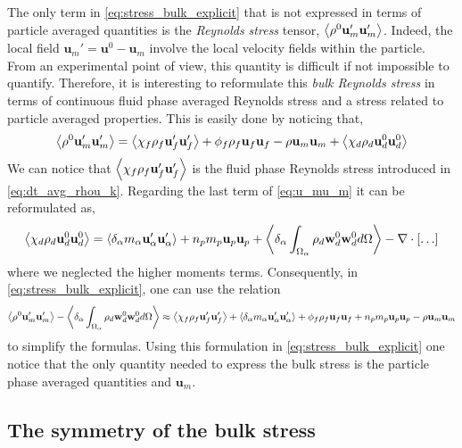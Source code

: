 The only term in \ref{eq:stress_bulk_explicit} that is not expressed in terms of particle averaged quantities is the \textit{Reynolds stress} tensor, $\left<\rho^0 \textbf{u}'_m\textbf{u}'_m\right>$. 
Indeed, the local field $\textbf{u}_m' = \textbf{u}^0 - \textbf{u}_m$ involve the local velocity fields within the particle.
From an experimental point of view, this quantity is difficult if not impossible to quantify.  
Therefore, it is interesting to reformulate this \textit{bulk Reynolds stress} in terms of continuous fluid phase averaged Reynolds stress and a stress related to particle averaged properties. 
This is easily done by noticing that, 
\begin{equation*}
    \avg{\rho^0 \textbf{u}'_m\textbf{u}'_m}
    = 
    \avg{\chi_f \rho_f \textbf{u}_f'\textbf{u}_f'}
    + \phi_f \rho_f \textbf{u}_f\textbf{u}_f
    - \rho \textbf{u}_m\textbf{u}_m
    + \avg{\chi_d \rho_d \textbf{u}_d^0\textbf{u}_d^0}
    \label{eq:u_mu_m}
\end{equation*}
We can notice that $\left<\chi_f \rho_f \textbf{u}_f'\textbf{u}_f'\right>$ is the fluid phase Reynolds stress introduced in \ref{eq:dt_avg_rhou_k}. 
Regarding the last term of \ref{eq:u_mu_m} it can be reformulated as, 
\begin{equation*}
    \left<\chi_d \rho_d \textbf{u}_d^0\textbf{u}_d^0\right>
    = 
    \left<\delta_\alpha  m_\alpha \textbf{u}_\alpha' \textbf{u}_\alpha' \right>
    + n_p m_p \textbf{u}_p\textbf{u}_p
    + \left<\delta_\alpha \int_{\Omega_{\alpha}} \rho_d \textbf{w}_d^0 \textbf{w}_d^0 d\Omega\right>
    - \mathbf{\nabla}\cdot [\ldots]
\end{equation*}
where we neglected the higher moments terms. 
Consequently, in \ref{eq:stress_bulk_explicit}, one can use the relation 
\begin{equation*}
    \left<\rho^0 \textbf{u}'_m\textbf{u}'_m\right>
    - \left<\delta_\alpha \int_{\Omega_{\alpha}} \rho_d \textbf{w}_d^0 \textbf{w}_d^0 d\Omega\right>
    \approx 
    \left<\chi_f \rho_f \textbf{u}_f'\textbf{u}_f'\right>
    + \left<\delta_\alpha  m_\alpha \textbf{u}_\alpha'\textbf{u}_\alpha'\right>
    + \phi_f \rho_f \textbf{u}_f\textbf{u}_f
    + n_p m_p \textbf{u}_p\textbf{u}_p
    - \rho \textbf{u}_m\textbf{u}_m
\end{equation*}
to simplify the formulas. 
Using this formulation in \ref{eq:stress_bulk_explicit} one notice that the only quantity needed to express the bulk stress is the particle phase averaged quantities and $\textbf{u}_m$. 

\subsection{The symmetry of the bulk stress}

